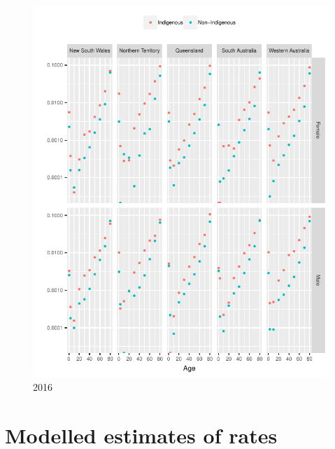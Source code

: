 \documentclass{article}
\begin{document}
\begin{figure}
  \centering
  \includegraphics{out/fig_rates_direct_2016}
  \caption{2016}
\end{figure}
\newpage

\clearpage
\section{Modelled estimates of rates}
\newpage
\end{document}
